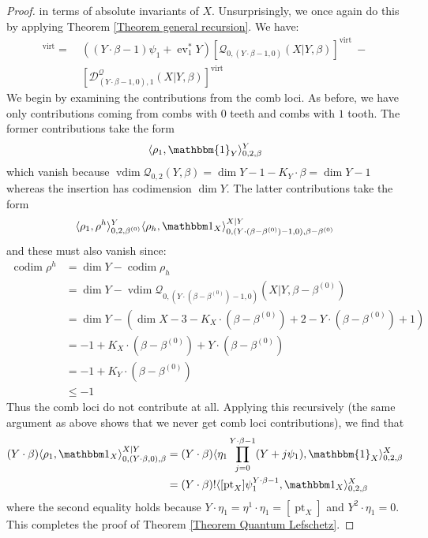 \documentclass[10pt]{amsart}
\newcommand{\Q}[4]{\mathcal{Q}_{#1,#2}(#3,#4)}
\newcommand{\virt}[1]{[#1]^{\operatorname{virt}}}
\newcommand{\pt}{\operatorname{pt}}
\newcommand{\ev}{\operatorname{ev}}
\newcommand{\codim}{\operatorname{codim}}
\newcommand{\vdim}{\operatorname{vdim}}
\theoremstyle{definition}
\theoremstyle{definition}
\begin{document}
\begin{proof}
in terms of absolute invariants of $X$. Unsurprisingly, we once again do this by applying Theorem \ref{Theorem general recursion}. We have:
\begin{align*} \virt{\Q{0}{(Y \cdot \beta,0)}{X|Y}{\beta}} = \ & ((Y\cdot\beta-1)\psi_1+\ev_1^*Y) \virt{\Q{0}{(Y\cdot\beta-1,0)}{X|Y}{\beta}} \ - \\
& \virt{\mathcal{D}_{(Y\cdot\beta-1,0),1}^{\mathcal Q}(X|Y,\beta)} \end{align*}
We begin by examining the contributions from the comb loci. As before, we have only contributions coming from combs with $0$ teeth and combs with $1$ tooth. The former contributions take the form
\begin{equation*} \langle \rho_1 , \mathbbm{1}_Y \rangle_{0,2,\beta}^Y \end{equation*}
which vanish because $\vdim{\Q{0}{2}{Y}{\beta}} = \dim Y -1 -K_Y\cdot\beta = \dim Y -1$ whereas the insertion has codimension $\dim Y$. The latter contributions take the form
\begin{equation*} \langle \rho_1 ,\rho^h\rangle_{0,2,\beta^{(0)}}^Y \langle \rho_h,\mathbbm 1_{X}\rangle_{0,(Y\cdot(\beta-\beta^{(0)})-1,0),\beta-\beta^{(0)}}^{X|Y}\end{equation*}
and these must also vanish since:
\begin{align*} \codim \rho^h & = \dim Y - \codim \rho_h \\
& = \dim Y - \vdim \Q{0}{(Y\cdot(\beta-\beta^{(0)})-1,0)}{X|Y}{\beta-\beta^{(0)}} \\
& = \dim Y - (\dim X - 3 - K_X \cdot (\beta - \beta^{(0)}) + 2 - Y \cdot (\beta - \beta^{(0)}) + 1) \\
&= -1 + K_X \cdot (\beta-\beta^{(0)}) + Y \cdot (\beta-\beta^{(0)}) \\
& = -1 + K_Y\cdot(\beta-\beta^{(0)}) \\
& \leq -1
\end{align*}
Thus the comb loci do not contribute at all. Applying this recursively (the same argument as above shows that we never get comb loci contributions), we find that
\begin{align*}
(Y\cdot\beta)\langle \rho_1 ,\mathbbm 1_{X}\rangle_{0,(Y\cdot\beta,0),\beta}^{X|Y} & = (Y\cdot\beta) \langle \eta_1 \prod_{j=0}^{Y\cdot\beta-1}(Y+j\psi_1) , \mathbbm{1}_X \rangle_{0,2,\beta}^X \\
& = (Y\cdot\beta)!\langle[ \pt_X]\psi_1^{Y\cdot\beta-1},\mathbbm 1_X\rangle_{0,2,\beta}^X
\end{align*}
where the second equality holds because $Y\cdot\eta_1=\eta^1 \cdot \eta_1 = [\pt_X]$ and $Y^2\cdot\eta_1=0$. This completes the proof of Theorem \ref{Theorem Quantum Lefschetz}. \end{proof}
\end{document}
